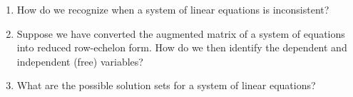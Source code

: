 \begin{enumerate}
\item How do we recognize when a system of linear equations is inconsistent?
\item Suppose we have converted the augmented matrix of a system of equations into reduced row-echelon form.  How do we then identify the dependent and independent (free) variables?
\item What are the possible solution sets for a system of linear equations?
\end{enumerate}

